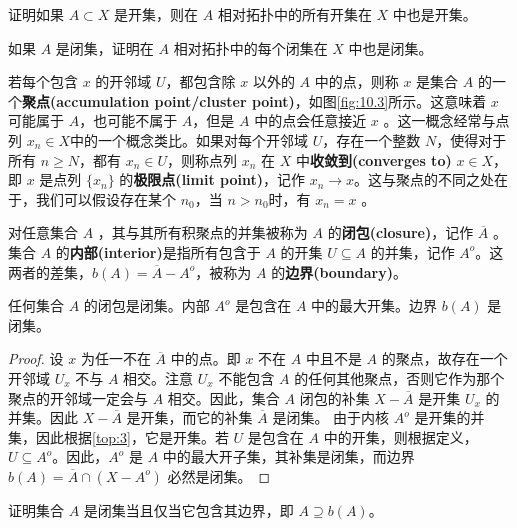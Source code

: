 \begin{exercise}
	证明如果 $A\subset X$ 是开集，则在 $A$ 相对拓扑中的所有开集在 $X$ 中也是开集。
\end{exercise}

\begin{exercise}
	如果 $A$ 是闭集，证明在 $A$ 相对拓扑中的每个闭集在 $X$ 中也是闭集。
\end{exercise}

	若每个包含 $x$ 的开邻域 $U$，都包含除 $x$ 以外的 $A$ 中的点，则称 $x$ 是集合 $A$ 的一个\textbf{聚点(accumulation point/cluster point)}，如图\ref{fig:10.3}所示。这意味着 $x$ 可能属于 $A$，也可能不属于 $A$，但是 $A$ 中的点会任意接近 $x$ 。这一概念经常与点列 $x_{n} \in X$中的一个概念类比。如果对每个开邻域 $U$，存在一个整数 $N$，使得对于所有 $n\geq N$，都有 $x_{n} \in U$，则称点列 $x_{n}$ 在 $X$ 中\textbf{收敛到(converges to)} $x\in X$，即 $x$ 是点列 $\{x_{n} \}$ 的\textbf{极限点(limit point)}，记作 $x_{n}\rightarrow x$。这与聚点的不同之处在于，我们可以假设存在某个 $n_{0}$，当 $n >n_{0}$时，有 $x_{n} =x$ 。

	对任意集合 $A$ ，其与其所有积聚点的并集被称为 $A$ 的\textbf{闭包(closure)}，记作 $\overline{A}$ 。集合 $A$ 的\textbf{内部(interior)}是指所有包含于 $A$ 的开集 $U\subseteq A$ 的并集，记作 $A^{o}$。这两者的差集，$b(A)=\overline{A} -A^{o}$，被称为 $A$ 的\textbf{边界(boundary)}。

\begin{theorem}\label{thm:10.2} 
	任何集合 $A$ 的闭包是闭集。内部 $A^{o}$ 是包含在 $A$ 中的最大开集。边界 $b(A)$ 是闭集。
\end{theorem}

\begin{proof}
	设 $x$ 为任一不在 $\overline{A}$ 中的点。即 $x$ 不在 $A$ 中且不是 $A$ 的聚点，故存在一个开邻域 $U_{x}$ 不与 $A$ 相交。注意 $U_{x}$ 不能包含 $A$ 的任何其他聚点，否则它作为那个聚点的开邻域一定会与 $A$ 相交。因此，集合 $A$ 闭包的补集 $X-\overline{A}$ 是开集 $U_{x}$ 的并集。因此 $X-\overline{A}$ 是开集，而它的补集 $\overline{A}$ 是闭集。
	由于内核 $A^{o}$ 是开集的并集，因此根据\ref{top:3}，它是开集。若 $U$ 是包含在 $A$ 中的开集，则根据定义，$U\subseteq A^{o}$。因此，$A^{o}$ 是 $A$ 中的最大开子集，其补集是闭集，而边界 $b(A)=\overline{A} \cap \left( X-A^{o}\right)$ 必然是闭集。
\end{proof}

\begin{exercise}
	证明集合 $A$ 是闭集当且仅当它包含其边界，即 $A\supseteq b(A)$。
\end{exercise}

